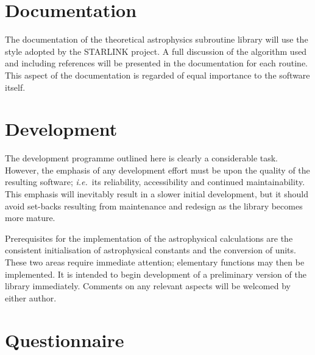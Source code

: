 \section {Documentation}
The documentation of the theoretical astrophysics subroutine library will use
the style adopted by the STARLINK project.
A full discussion of the algorithm used and including
references will be presented in the documentation for each routine.
This aspect of the documentation is regarded of equal importance to the
software itself.

\section {Development}
The development programme outlined here is clearly a considerable task.
However, the emphasis of any development effort must be upon the quality
of the resulting software; {\em i.e.}\ its reliability, accessibility and
continued maintainability.
This emphasis will inevitably result in a slower initial development, but
it should avoid set-backs resulting from maintenance and redesign as the
library becomes more mature.

Prerequisites for the implementation of the astrophysical calculations are
the consistent initialisation of astrophysical constants and the
conversion of units.
These two areas require immediate attention; elementary functions may then be
implemented.
It is intended to begin development of a preliminary version of the library
immediately.
Comments on any relevant aspects will be welcomed by either author.

\newpage
\appendix
\section {Questionnaire} \label{quest_sect}


